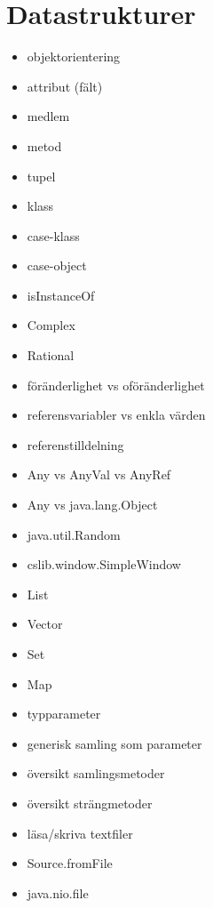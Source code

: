 \chapter{Datastrukturer}\label{chapter:W04}
\begin{multicols}{2}\begin{itemize}[nosep,label={$\square$}]
\item objektorientering
\item attribut (fält)
\item medlem
\item metod
\item tupel
\item klass
\item case-klass
\item case-object
\item isInstanceOf
\item Complex
\item Rational
\item föränderlighet vs oföränderlighet
\item referensvariabler vs enkla värden
\item referenstilldelning
\item Any vs AnyVal vs AnyRef
\item Any vs java.lang.Object
\item java.util.Random
\item cslib.window.SimpleWindow
\item List
\item Vector
\item Set
\item Map
\item typparameter
\item generisk samling som parameter
\item översikt samlingsmetoder
\item översikt strängmetoder
\item läsa/skriva textfiler
\item Source.fromFile
\item java.nio.file\end{itemize}\end{multicols}
